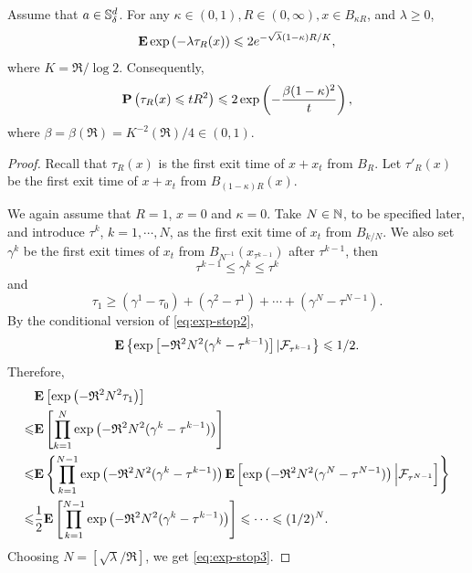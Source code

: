 \begin{theorem}
    Assume that \(a\in {\mathbb S}^d_{\delta}\). For any $\kappa \in(0,1), R \in(0, \infty), x \in B_{\kappa R}$, and $\lambda \geq 0$,
    \begin{equation}\label{eq:exp-stop3}
        {\mathbf E}  \exp \left(-\lambda{\tau_R(x)}\right) \leqslant 2 e^{-\sqrt{\lambda}(1-\kappa) R / K},
    \end{equation}
    where $K= \mathfrak{R}/ \log 2$. Consequently,  
    \begin{equation}\label{eq:stop-lower2}
        {\mathbf P}\left({\tau_R(x)} \leqslant t R^2\right) \leqslant 2 \exp \left(-\frac{\beta(1-\kappa)^2}{t}\right), 
    \end{equation}
    where $\beta=\beta(\mathfrak{R})=K^{-2}(\mathfrak{R})/4\in (0,1)$.
\end{theorem}
\begin{proof}
    Recall that $\tau_R(x)$ is the first exit time of $x+x_t$ from $B_R$. Let $\tau'_R(x)$ be the first exit time of $x+x_t$ from $B_{(1-\kappa)R}(x)$. 
    
    We again assume that $R=1$, $x=0$ and $\kappa=0$. Take $N\in {\mathbb N}$, to be specified later, and introduce $\tau^{k}$, $k=1,\cdots, N$, as the first exit time of $x_t$ from $B_{k/N}$. We also set $\gamma^k$ be the first exit times of $x_t$ from $B_{N^{-1}}(x_{\tau^{k-1}})$ after $\tau^{k-1}$, then 
    \[
        \tau^{k-1}\leq \gamma^k\leq \tau^k
    \]
    and
    \[
        \tau_1\geq (\gamma^1-\tau_0)+ (\gamma^2-\tau^1)+\cdots+ (\gamma^N-\tau^{N-1}). 
    \]
    By the conditional version of \eqref{eq:exp-stop2}, 
    \begin{equation*}
        {\mathbf E} \left\{\exp\left[-\mathfrak{R}^2N^2 (\gamma^k-\tau^{k-1}) \right]| {\mathcal F}_{\tau^{k-1}}\right\}\leqslant 1/2. 
    \end{equation*}
    Therefore, 
    \begin{equation}\label{eq:exp-stop4}
	\begin{aligned}
            &{\mathbf E} \left[ \exp\left(-\mathfrak{R}^2N^2 \tau_1 \right)\right]\\
            \leqslant & {\mathbf E} \left[\prod_{k=1}^{N}\exp\left(-\mathfrak{R}^2N^2 (\gamma^k-\tau^{k-1}) \right)\right]\\ 
            \leqslant & {\mathbf E} \left\{ \prod_{k=1}^{N-1}\exp\left(-\mathfrak{R}^2N^2 (\gamma^k-\tau^{k-1}) \right) {\mathbf E} \left[ \exp\left(-\mathfrak{R}^2N^2 (\gamma^N-\tau^{N-1}) \right)\Big| {\mathcal F}_{\tau^{N-1}}\right] \right\}\\ 
            \leqslant & \frac{1}{2} {\mathbf E} \left[\prod_{k=1}^{N-1}\exp\left(-\mathfrak{R}^2N^2 (\gamma^k-\tau^{k-1}) \right)\right] \leqslant \cdots \leqslant (1/2)^N. 
	\end{aligned}
    \end{equation}
    Choosing  $N= [\sqrt{\lambda}/\mathfrak{R}]$, we get \eqref{eq:exp-stop3}. 


\end{proof}

